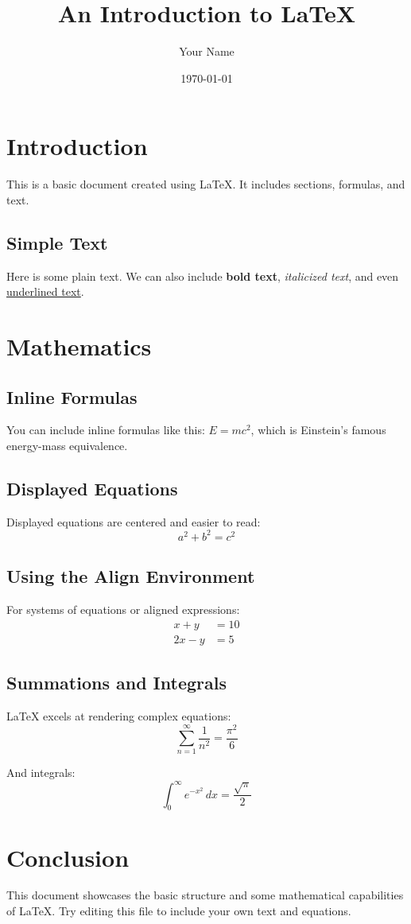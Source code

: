 \documentclass[a4paper,12pt]{article}
\title{An Introduction to LaTeX}
\author{Your Name}
\date{\today}
\begin{document}
\maketitle

\section{Introduction}
This is a basic document created using \LaTeX. It includes sections, formulas, and text. 

\subsection{Simple Text}
Here is some plain text. We can also include \textbf{bold text}, \textit{italicized text}, and even \underline{underlined text}.

\section{Mathematics}

\subsection{Inline Formulas}
You can include inline formulas like this: \( E = mc^2 \), which is Einstein's famous energy-mass equivalence.

\subsection{Displayed Equations}
Displayed equations are centered and easier to read:
\[
a^2 + b^2 = c^2
\]

\subsection{Using the Align Environment}
For systems of equations or aligned expressions:
\begin{align*}
x + y &= 10 \\
2x - y &= 5
\end{align*}

\subsection{Summations and Integrals}
LaTeX excels at rendering complex equations:
\[
\sum_{n=1}^\infty \frac{1}{n^2} = \frac{\pi^2}{6}
\]

And integrals:
\[
\int_0^\infty e^{-x^2} \, dx = \frac{\sqrt{\pi}}{2}
\]

\section{Conclusion}
This document showcases the basic structure and some mathematical capabilities of \LaTeX. Try editing this file to include your own text and equations.
\end{document}
